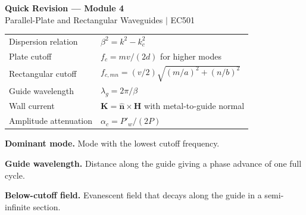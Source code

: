 \documentclass[12pt,a4paper]{article}
\renewcommand{\arraystretch}{1.45}
\begin{document}
\newpage
\begin{center}
  {\large\bfseries\color{myred} Quick Revision --- Module 4}\\[3pt]
  {\small\color{mydark} Parallel-Plate and Rectangular Waveguides $|$ EC501}
\end{center}
\noindent{\color{myred}\rule{\linewidth}{1.2pt}}
\begin{tcolorbox}[formulabox,title={Key Formulas at a Glance}]
\renewcommand{\arraystretch}{1.35}
\begin{tabularx}{\linewidth}{B{5.0cm}Y}
Dispersion relation & $\beta^2=k^2-k_c^2$ \\[3pt]
Plate cutoff & $f_c=mv/(2d)$ for higher modes \\[3pt]
Rectangular cutoff & $f_{c,mn}=(v/2)\sqrt{(m/a)^2+(n/b)^2}$ \\[3pt]
Guide wavelength & $\lambda_g=2\pi/\beta$ \\[3pt]
Wall current & $\mathbf K=\hat{\mathbf n}\times\mathbf H$ with metal-to-guide normal \\[3pt]
Amplitude attenuation & $\alpha_c=P'_w/(2P)$ \\[3pt]
\end{tabularx}
\end{tcolorbox}
\begin{tcolorbox}[defbox,title={One-Line Definitions}]
\textbf{Dominant mode.} Mode with the lowest cutoff frequency.\par
\textbf{Guide wavelength.} Distance along the guide giving a phase advance of one full cycle.\par
\textbf{Below-cutoff field.} Evanescent field that decays along the guide in a semi-infinite section.\par
\end{tcolorbox}
\end{document}
